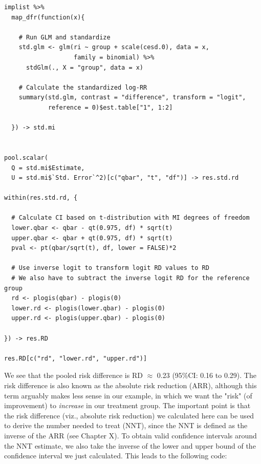\begin{lstlisting}
implist %>% 
  map_dfr(function(x){
    
    # Run GLM and standardize
    std.glm <- glm(ri ~ group + scale(cesd.0), data = x,
                   family = binomial) %>% 
      stdGlm(., X = "group", data = x)
    
    # Calculate the standardized log-RR
    summary(std.glm, contrast = "difference", transform = "logit",
            reference = 0)$est.table["1", 1:2] 
    
  }) -> std.mi


pool.scalar(
  Q = std.mi$Estimate,
  U = std.mi$`Std. Error`^2)[c("qbar", "t", "df")] -> res.std.rd

within(res.std.rd, {
  
  # Calculate CI based on t-distribution with MI degrees of freedom
  lower.qbar <- qbar - qt(0.975, df) * sqrt(t)
  upper.qbar <- qbar + qt(0.975, df) * sqrt(t)
  pval <- pt(qbar/sqrt(t), df, lower = FALSE)*2
  
  # Use inverse logit to transform logit RD values to RD
  # We also have to subtract the inverse logit RD for the reference group
  rd <- plogis(qbar) - plogis(0)
  lower.rd <- plogis(lower.qbar) - plogis(0)
  upper.rd <- plogis(upper.qbar) - plogis(0)
  
}) -> res.RD

res.RD[c("rd", "lower.rd", "upper.rd")]
\end{lstlisting}



We see that the pooled risk difference is RD $\approx$ 0.23 (95\%CI: 0.16 to 0.29). The risk difference is also known as the absolute risk reduction (ARR), although this term arguably makes less sense in our example, in which we want the "risk" (of improvement) to \emph{increase} in our treatment group. The important point is that the risk difference (viz., absolute risk reduction) we calculated here can be used to derive the number needed to treat (NNT), since the NNT is defined as the inverse of the ARR (see Chapter X). To obtain valid confidence intervals around the NNT estimate, we also take the inverse of the lower and upper bound of the confidence interval we just calculated. This leads to the following code:

